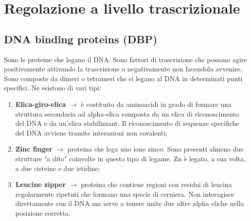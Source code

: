 \section{Regolazione a livello trascrizionale}
\subsection{DNA binding proteins (DBP)}
Sono le proteine che legano il DNA. Sono fattori di trascrizione che possono agire positivamente attivando la trascrizione o negativamente non facendola avvenire. Sono composte da dimeri o tetrameri che si legano al DNA in determinati punti specifici. Ne esistono di vari tipi:
\begin{enumerate}
    \item \textbf{Elica-giro-elica} $\xrightarrow{}$ è costituito da aminoacidi in grado di formare una struttura secondaria ad alpha-elica composta da un elica di riconoscimento del DNA e da un'elica stabilizzant. Il riconoscimento di sequenze specifiche del DNA avviene tramite interazioni non covalenti; 
    \item \textbf{Zinc finger} $\xrightarrow{}$ proteina che lega uno ione zinco. Sono presenti almeno due strutture "a dito" coinvolte in questo tipo di legame. Zn è legato, a sua volta, a due cisteine e due istidine; 
    \item \textbf{Leucine zipper} $\xrightarrow{}$ proteina che contiene regioni con residui di leucina regolarmente ripetuti che formano una specie di cerniera. Non interagisce direttamente con il DNA ma serve a tenere unite due altre alpha eliche nella posizione corretta. 
\end{enumerate}
